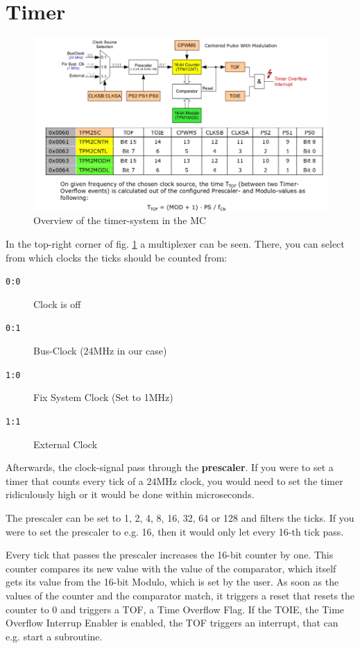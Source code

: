 \documentclass[a4paper, 11pt, nofootinbib]{book}
\newcommand{\code}[1]{\texttt{#1}}
\begin{document}
\section{Timer}
\begin{figure}[htb]
	\centering
	\includegraphics[keepaspectratio=true,height=15\baselineskip]{timer.jpg}
	\caption{Overview of the timer-system in the MC}
	\label{fig:timer}
\end{figure}


In the top-right corner of fig. \ref{fig:timer} a multiplexer can be seen. There, you can select from which clocks the ticks should be counted from:
\begin{multicols}{2}
	\begin{description}
		\item[\code{0:0}] Clock is off
		\item[\code{0:1}] Bus-Clock (24MHz in our case)
		\item[\code{1:0}] Fix System Clock (Set to 1MHz)
		\item[\code{1:1}] External Clock
	\end{description}
\end{multicols}


Afterwards, the clock-signal pass through the \textbf{prescaler}. If you were to set a timer that counts every tick of a 24MHz clock, you would need to set the timer ridiculously high or it would be done within microseconds.

The prescaler can be set to 1, 2, 4, 8, 16, 32, 64 or 128 and filters the ticks. If you were to set the prescaler to e.g. 16, then it would only let every 16-th tick pass. 

Every tick that passes the prescaler increases the 16-bit counter by one. This counter compares its new value with the value of the comparator, which itself gets its value from the 16-bit Modulo, which is set by the user. As soon as the values of the counter and the comparator match, it triggers a reset that resets the counter to 0 and triggers a TOF, a Time Overflow Flag. If the TOIE, the Time Overflow Interrup Enabler is enabled, the TOF triggers an interrupt, that can e.g. start a subroutine.
\end{document}
